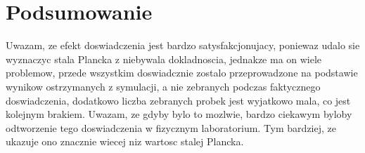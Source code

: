 \documentclass{article}
\begin{document}
\section{Podsumowanie}
Uwazam, ze efekt doswiadczenia jest bardzo satysfakcjonujacy, poniewaz udalo sie wyznaczyc stala Plancka z niebywala dokladnoscia, jednakze ma on wiele problemow, przede wszystkim doswiadcznie zostalo przeprowadzone na podstawie wynikow ostrzymanych z symulacji, a nie zebranych podczas faktycznego doswiadczenia, dodatkowo liczba zebranych probek jest wyjatkowo mala, co jest kolejnym brakiem. Uwazam, ze gdyby  bylo to mozlwie, bardzo ciekawym byloby odtworzenie tego doswiadczenia w fizycznym laboratorium. Tym bardziej, ze ukazuje ono znacznie wiecej niz wartosc stalej Plancka.
\end{document}
